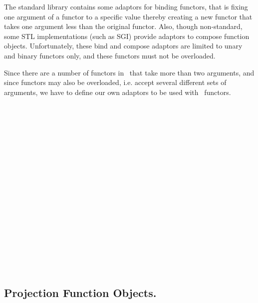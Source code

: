 The standard library contains some adaptors for binding functors, that
is fixing one argument of a functor to a specific value thereby
creating a new functor that takes one argument less than the original
functor.  Also, though non-standard, some STL implementations (such as
SGI) provide adaptors to compose function objects. Unfortunately,
these bind and compose adaptors are limited to unary and binary
functors only, and these functors must not be overloaded.

Since there are a number of functors in \cgal\ that take more than two
arguments, and since functors may also be overloaded, i.e. accept
several different sets of arguments, we have to define our own
adaptors to be used with \cgal\ functors.

\\
\\
\\
\\
\\
\\
\\
\\
\\
\\
\\
\\
\\
\\
\\
\\
\\

\subsection*{Projection Function Objects.}

